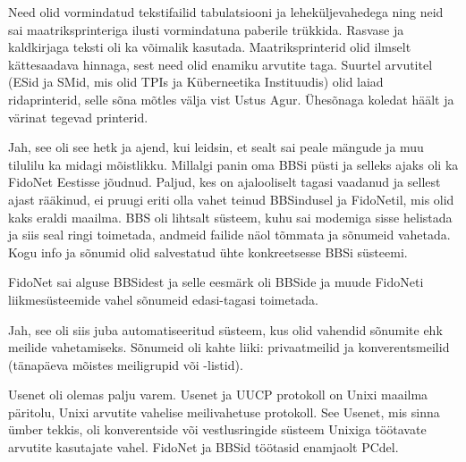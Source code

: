 
Need olid vormindatud tekstifailid 
tabulatsiooni ja leheküljevahedega ning neid sai maatriksprinteriga 
ilusti vormindatuna paberile trükkida. Rasvase 
ja kaldkirjaga teksti oli ka võimalik kasutada.
Maatriksprinterid olid ilmselt kättesaadava hinnaga, sest need olid enamiku arvutite taga. 
Suurtel arvutitel (ESid ja SMid, mis olid TPIs ja Küberneetika 
Instituudis) olid laiad ridaprinterid, selle sõna mõtles välja vist Ustus Agur. Ühesõnaga koledat häält ja värinat tegevad 
printerid.


Jah, see oli see hetk ja ajend, kui leidsin, et sealt sai
peale mängude ja muu tilulilu ka midagi mõistlikku. Millalgi panin oma BBSi 
püsti ja selleks ajaks oli ka FidoNet Eestisse 
jõudnud. Paljud, kes on ajalooliselt tagasi vaadanud ja 
sellest ajast rääkinud, ei pruugi eriti olla vahet teinud BBSindusel ja FidoNetil, mis 
olid kaks eraldi maailma. BBS oli lihtsalt 
süsteem, kuhu sai modemiga sisse helistada ja siis seal ringi toimetada, 
andmeid failide näol tõmmata ja sõnumeid 
vahetada. Kogu info ja sõnumid olid salvestatud ühte 
konkreetsesse BBSi süsteemi.

FidoNet sai alguse BBSidest ja selle eesmärk 
oli BBSide ja muude FidoNeti liikmesüsteemide vahel sõnumeid
edasi-tagasi toimetada. 


Jah, see oli siis juba automatiseeritud süsteem, kus olid vahendid 
sõnumite ehk meilide vahetamiseks. Sõnumeid oli kahte liiki: 
privaatmeilid ja konverentsmeilid (tänapäeva mõistes 
meiligrupid või -listid).


Usenet oli olemas palju varem. Usenet ja UUCP protokoll 
on Unixi maailma päritolu,  
Unixi arvutite vahelise meilivahetuse protokoll. See Usenet, mis sinna 
ümber tekkis, oli konverentside või vestlusringide 
süsteem Unixiga töötavate arvutite kasutajate vahel. FidoNet ja BBSid töötasid
enamjaolt PCdel.

